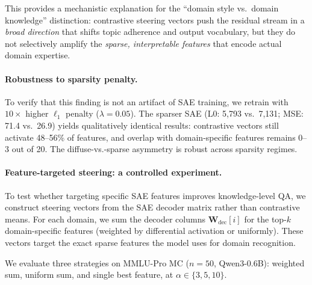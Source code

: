 \documentclass[11pt,a4paper]{article}
\begin{document}
This provides a mechanistic explanation for the ``domain style vs.\ domain knowledge'' distinction: contrastive steering vectors push the residual stream in a \textit{broad direction} that shifts topic adherence and output vocabulary, but they do not selectively amplify the \textit{sparse, interpretable features} that encode actual domain expertise.

\paragraph{Robustness to sparsity penalty.}
To verify that this finding is not an artifact of SAE training, we retrain with $10\times$ higher $\ell_1$ penalty ($\lambda = 0.05$). The sparser SAE (L0: 5{,}793 vs.\ 7{,}131; MSE: 71.4 vs.\ 26.9) yields qualitatively identical results: contrastive vectors still activate 48--56\% of features, and overlap with domain-specific features remains 0--3 out of 20. The diffuse-vs.-sparse asymmetry is robust across sparsity regimes.

\paragraph{Feature-targeted steering: a controlled experiment.}
\label{sec:feature_targeted}
To test whether targeting specific SAE features improves knowledge-level QA, we construct steering vectors from the SAE decoder matrix rather than contrastive means. For each domain, we sum the decoder columns $\mathbf{W}_\text{dec}[i]$ for the top-$k$ domain-specific features (weighted by differential activation or uniformly). These vectors target the exact sparse features the model uses for domain recognition.

We evaluate three strategies on MMLU-Pro MC ($n=50$, Qwen3-0.6B): weighted sum, uniform sum, and single best feature, at $\alpha \in \{3, 5, 10\}$.
\end{document}
